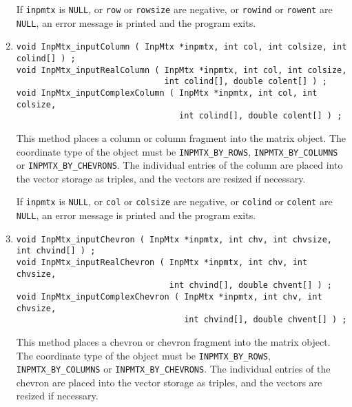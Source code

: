 \begin{enumerate}
If {\tt inpmtx} is {\tt NULL}, or {\tt row} or {\tt rowsize} 
are negative, or {\tt rowind} or {\tt rowent} are {\tt NULL},
an error message is printed and the program exits.
\item
\begin{verbatim}
void InpMtx_inputColumn ( InpMtx *inpmtx, int col, int colsize, int colind[] ) ;
void InpMtx_inputRealColumn ( InpMtx *inpmtx, int col, int colsize, 
                              int colind[], double colent[] ) ;
void InpMtx_inputComplexColumn ( InpMtx *inpmtx, int col, int colsize, 
                                 int colind[], double colent[] ) ;
\end{verbatim}
This method places a column or column fragment into the matrix object.
The coordinate type of the object must be 
{\tt INPMTX\_BY\_ROWS}, {\tt INPMTX\_BY\_COLUMNS} 
or {\tt INPMTX\_BY\_CHEVRONS}.
The individual entries of the column are placed into the vector
storage as triples, and the vectors are resized if necessary.
\par {}
If {\tt inpmtx} is {\tt NULL}, or {\tt col} or {\tt colsize} 
are negative, or {\tt colind} or {\tt colent} are {\tt NULL},
an error message is printed and the program exits.
\item
\begin{verbatim}
void InpMtx_inputChevron ( InpMtx *inpmtx, int chv, int chvsize, int chvind[] ) ;
void InpMtx_inputRealChevron ( InpMtx *inpmtx, int chv, int chvsize, 
                               int chvind[], double chvent[] ) ;
void InpMtx_inputComplexChevron ( InpMtx *inpmtx, int chv, int chvsize, 
                                  int chvind[], double chvent[] ) ;
\end{verbatim}
This method places a chevron or chevron fragment into the matrix object.
The coordinate type of the object must be 
{\tt INPMTX\_BY\_ROWS}, {\tt INPMTX\_BY\_COLUMNS} 
or {\tt INPMTX\_BY\_CHEVRONS}.
The individual entries of the chevron are placed into the vector
storage as triples, and the vectors are resized if necessary.

\end{enumerate}
